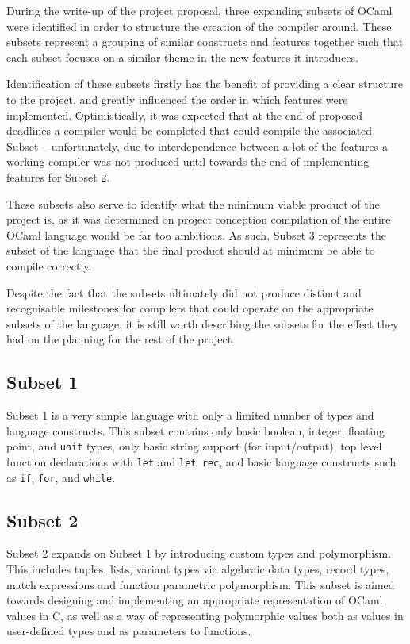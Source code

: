 During the write-up of the project proposal, three expanding subsets of OCaml 
were identified in order to structure the creation of the compiler around. 
These subsets represent a grouping of similar constructs and features together 
such that each subset focuses on a similar theme in the new features it 
introduces.

Identification of these subsets firstly has the benefit of providing a clear 
structure to the project, and greatly influenced the order in which features 
were implemented. Optimistically, it was expected that at the end of proposed 
deadlines a compiler would be completed that could compile the associated 
Subset -- unfortunately, due to interdependence between a lot of the features a 
working compiler was not produced until towards the end of implementing 
features for Subset 2.

These subsets also serve to identify what the minimum viable product of the 
project is, as it was determined on project conception compilation of the 
entire OCaml language would be far too ambitious. As such, Subset 3 represents 
the subset of the language that the final product should at minimum be able to 
compile correctly.

Despite the fact that the subsets ultimately did not produce distinct and 
recognisable milestones for compilers that could operate on the appropriate 
subsets of the language, it is still worth describing the subsets for the 
effect they had on the planning for the rest of the project.

\subsection{Subset 1}

Subset 1 is a very simple language with only a limited number of types and 
language constructs. This subset contains only basic boolean, integer, floating 
point, and \texttt{unit} types, only basic string support (for input/output), 
top level function declarations with \texttt{let} and \texttt{let rec}, and 
basic language constructs such as \texttt{if}, \texttt{for}, and \texttt{while}.

\subsection{Subset 2}

Subset 2 expands on Subset 1 by introducing custom types and polymorphism. This 
includes tuples, lists, variant types via algebraic data types, record types, 
match expressions and function parametric polymorphism. This subset is aimed 
towards designing and implementing an appropriate representation of OCaml 
values in C, as well as a way of representing polymorphic values both as values 
in user-defined types and as parameters to functions.

